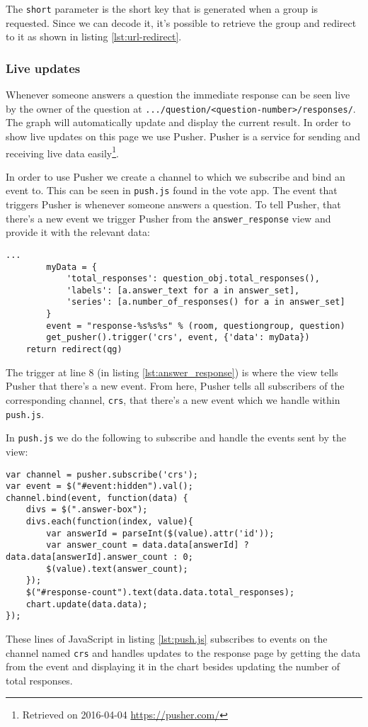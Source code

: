 The \texttt{short} parameter is the short key that is generated when a group is requested. Since we can decode it, it's possible to retrieve the group and redirect to it as shown in listing \ref{lst:url-redirect}.

\subsubsection*{Live updates}
Whenever someone answers a question the immediate response can be seen live by the owner of the question at \texttt{.../question/<question-number>/responses/}. The graph will automatically update and display the current result. In order to show live updates on this page we use Pusher. Pusher is a service for sending and receiving live data easily\footnote{Retrieved on 2016-04-04 \url{https://pusher.com/}}.


In order to use Pusher we create a channel to which we subscribe and bind an event to. This can be seen in \texttt{push.js} found in the vote app. The event that triggers Pusher is whenever someone answers a question. To tell Pusher, that there's a new event we trigger Pusher from the \texttt{answer\_response} view and provide it with the relevant data:

\begin{lstlisting}[caption=Selected parts of the answer\_response view, label=lst:answer_response]
        ...
        myData = {
            'total_responses': question_obj.total_responses(),
            'labels': [a.answer_text for a in answer_set],
            'series': [a.number_of_responses() for a in answer_set]
        }
        event = "response-%s%s%s" % (room, questiongroup, question)
        get_pusher().trigger('crs', event, {'data': myData})
    return redirect(qg)
\end{lstlisting}

The trigger at line 8 (in listing \ref{lst:answer_response}) is where the view tells Pusher that there's a new event. From here, Pusher tells all subscribers of the corresponding channel, \texttt{crs}, that there's a new event which we handle within \texttt{push.js}.

In \texttt{push.js} we do the following to subscribe and handle the events sent by the view:

\begin{lstlisting}[caption=Selected parts of push.js, label=lst:push.js]
var channel = pusher.subscribe('crs');
var event = $("#event:hidden").val();
channel.bind(event, function(data) {
    divs = $(".answer-box");
    divs.each(function(index, value){
        var answerId = parseInt($(value).attr('id'));
        var answer_count = data.data[answerId] ? data.data[answerId].answer_count : 0;
        $(value).text(answer_count);
    });
    $("#response-count").text(data.data.total_responses);
    chart.update(data.data);
});
\end{lstlisting}
These lines of JavaScript in listing \ref{lst:push.js} subscribes to events on the channel named \texttt{crs} and handles updates to the response page by getting the data from the event and displaying it in the chart besides updating the number of total responses.


